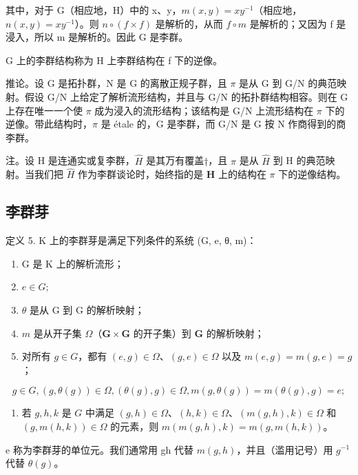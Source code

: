 其中，对于 G（相应地，H）中的 x、y，\(m(x,y)=xy^{-1}\)（相应地，\(n(x,y)=xy^{-1}\)）。则 \(n\circ(f\times f)\) 是解析的，从而 \(f\circ m\) 是解析的；又因为 f 是浸入，所以 m 是解析的。因此 G 是李群。

G 上的李群结构称为 H 上李群结构在 f 下的逆像。

推论。设 G 是拓扑群，N 是 G 的离散正规子群，且 \(\pi\) 是从 G 到 G/N 的典范映射。假设 G/N 上给定了解析流形结构，并且与 G/N 的拓扑群结构相容。则在 G 上存在唯一一个使 \(\pi\) 成为浸入的流形结构；该结构是 G/N 上流形结构在 \(\pi\) 下的逆像。带此结构时，\(\pi\) 是 étale 的，G 是李群，而 G/N 是 G 按 N 作商得到的商李群。

注。设 H 是连通实或复李群，\(\hat{H}\) 是其万有覆盖\(\dagger\)，且 \(\pi\) 是从 \(\hat{H}\) 到 H 的典范映射。当我们把 \(\hat{H}\) 作为李群谈论时，始终指的是 \(\mathbf{H}\) 上的结构在 \(\pi\) 下的逆像结构。

\subsection{李群芽}

定义 5. K 上的李群芽是满足下列条件的系统 (G, e, θ, m)：

\begin{enumerate}
\def\labelenumi{(\roman{enumi})}
\item
  G 是 K 上的解析流形；
\item
  \(e \in G;\)
\item
  \(\theta\) 是从 G 到 G 的解析映射；
\item
  \(m\) 是从开子集 \(\Omega\)（\(\mathbf{G} \times \mathbf{G}\) 的开子集）到 \(\mathbf{G}\) 的解析映射；
\item
  对所有 \(g \in G\)，都有 \((e, g) \in \Omega\)、\((g, e) \in \Omega\) 以及 \(m(e, g) = m(g, e) = g\)；
\end{enumerate}

\[
g \in G, (g, \theta (g)) \in \Omega , (\theta (g), g) \in \Omega , m (g, \theta (g)) = m (\theta (g), g) = e;
\]

\begin{enumerate}
\def\labelenumi{(\roman{enumi})}
\setcounter{enumi}{6}
\tightlist
\item
  若 \(g, h, k\) 是 \(G\) 中满足 \((g, h) \in \Omega\)、\((h, k) \in \Omega\)、\((m(g, h), k) \in \Omega\) 和 \((g, m(h, k)) \in \Omega\) 的元素，则 \(m(m(g, h), k) = m(g, m(h, k))\)。
\end{enumerate}

e 称为李群芽的单位元。我们通常用 gh 代替 \(m(g, h)\)，并且（滥用记号）用 \(g^{-1}\) 代替 \(\theta(g)\)。

